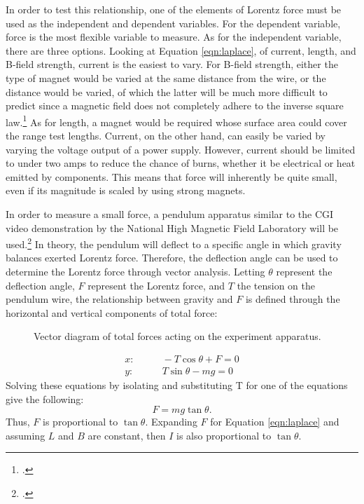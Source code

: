 In order to test this relationship, one of the elements of Lorentz force must be used as the independent and dependent variables.
For the dependent variable, force is the most flexible variable to measure.
As for the independent variable, there are three options.
Looking at Equation \eqref{eqn:laplace}, of current, length, and B-field strength, current is the easiest to vary.
For B-field strength, either the type of magnet would be varied at the same distance from the wire, or the distance would be varied, of which the latter will be much more difficult to predict since a magnetic field does not completely adhere to the inverse square law.\footcite{wwdistance}
As for length, a magnet would be required whose surface area could cover the range test lengths.
Current, on the other hand, can easily be varied by varying the voltage output of a power supply.
However, current should be limited to under two amps to reduce the chance of burns, whether it be electrical or heat emitted by components.
This means that force will inherently be quite small, even if its magnitude is scaled by using strong magnets.

In order to measure a small force, a pendulum apparatus similar to the CGI video demonstration by the National High Magnetic Field Laboratory will be used.\footcite{nmllorentz}
In theory, the pendulum will deflect to a specific angle in which gravity balances exerted Lorentz force.
Therefore, the deflection angle can be used to determine the Lorentz force through vector analysis.
Letting $\theta$ represent the deflection angle, $F$ represent the Lorentz force, and $T$ the tension on the pendulum wire, the relationship between gravity and $F$ is defined through the horizontal and vertical components of total force:
\begin{figure}[t!]
	\centering
	\caption{Vector diagram of total forces acting on the experiment apparatus.}
	\vspace{-1.5em}
	\label{fig:vector}
\end{figure}
\begin{align*}
	x:& \qquad -T \cos\theta + F =0 \\
	y:& \qquad T \sin\theta - mg =0
\end{align*}
Solving these equations by isolating and substituting T for one of the equations give the following:
\begin{equation}
	F = mg \tan\theta \text{.} \label{eqn:experiment}
\end{equation}
Thus, $F$ is proportional to $\tan\theta$. Expanding $F$ for Equation \eqref{eqn:laplace} and assuming $L$ and $B$ are constant, then $I$ is also proportional to $\tan\theta$.

